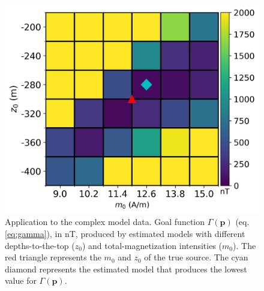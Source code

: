 \begin{figure}
	\centering
	\includegraphics[scale=.75]{figures/complex_gamma.png}
	\caption{Application to the complex model data. 
	Goal function $\Gamma(\mathbf{p})$ (eq. \ref{eq:gamma}), in nT,  
	produced by estimated models with different depths-to-the-top ($ z_0 $) and 
	total-magnetization intensities ($ m_0 $). 
	The red triangle represents the $m_0$ and $z_0$ of the true source. 
	The cyan diamond represents the estimated model that produces the lowest value for $\Gamma (\mathbf{p})$.}
	\label{fig:complex_map}
\end{figure}

